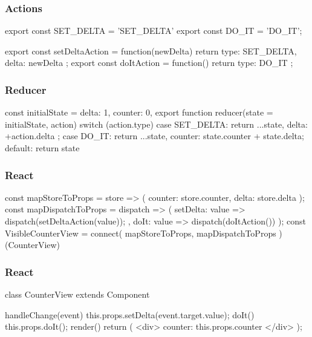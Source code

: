 \begin{frame}[fragile]\frametitle{Actions}
\begin{CodeBox}{}
export const SET_DELTA = 'SET_DELTA'
export const DO_IT = 'DO_IT';

export const setDeltaAction = function(newDelta) {
  return { type: SET_DELTA, delta: newDelta };
}
export const doItAction = function() {
  return { type: DO_IT };
}
\end{CodeBox}
\end{frame}

\begin{frame}[fragile]\frametitle{Reducer}
\begin{CodeBox}{}
const initialState = {
  delta: 1,
  counter: 0,
}
export function reducer(state = initialState, action) {
  switch (action.type) {
    case SET_DELTA:
      return {...state, delta: +action.delta };
    case DO_IT:
      return {...state, counter: state.counter + state.delta};
    default:
      return state
  }
}
\end{CodeBox}
\end{frame}

\begin{frame}[fragile]\frametitle{React}
\begin{CodeBox}{}
const mapStoreToProps = 
  store => ({ counter: store.counter, delta: store.delta });
const mapDispatchToProps = dispatch => ({
  setDelta: value => {
    dispatch(setDeltaAction(value));
  },
  doIt: value => {
    dispatch(doItAction())
  }
});
const VisibleCounterView = connect(
  mapStoreToProps,
  mapDispatchToProps
)(CounterView)
\end{CodeBox}
\end{frame}


\begin{frame}[fragile]\frametitle{React}
\begin{CodeBox}{}
class CounterView extends Component {

  handleChange(event) {
    this.props.setDelta(event.target.value);
  }
  doIt() {
    this.props.doIt();
  }
  render() {
    return (
      <div>
        counter: {this.props.counter}
      </div>
    );
  }
}
\end{CodeBox}
\end{frame}

